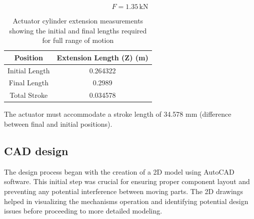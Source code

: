 \documentclass[../../main]{subfiles}
\begin{document}
\[
    F = 1.35 \, \text{kN}
\]
\begin{table}[h!]
  \centering
  \begin{tabular}{|c|c|}
      \hline \rowcolor{red!20}
      \textbf{Position} & \textbf{Extension Length (Z) (m)} \\ \hline
      Initial Length & 0.264322 \\ \hline
      Final Length & 0.2989 \\ \hline
      Total Stroke & 0.034578 \\ \hline
  \end{tabular}
  \caption[Actuator Cylinder Measurements]{Actuator cylinder extension measurements showing the initial and final lengths required for full range of motion}
  \label{tab:extension_length}
\end{table}

The actuator must accommodate a stroke length of 34.578 mm (difference
between final and initial positions).

\subsection{CAD design}

The design process began with the creation of a 2D model using AutoCAD
software. This initial step was crucial for ensuring proper component
layout and preventing any potential interference between moving parts.
The 2D drawings helped in visualizing the mechanism\textquotesingle s
operation and identifying potential design issues before proceeding to
more detailed modeling.
\end{document}
